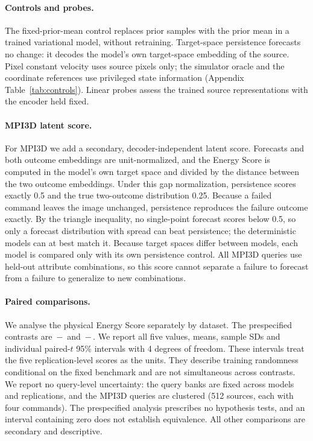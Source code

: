 \paragraph{Controls and probes.} The fixed-prior-mean control replaces prior samples with the prior mean in a trained variational model, without retraining. Target-space persistence forecasts no change: it decodes the model's own target-space embedding of the source. Pixel constant velocity uses source pixels only; the simulator oracle and the coordinate references use privileged state information (Appendix Table~\ref{tab:controls}). Linear probes assess the trained source representations with the encoder held fixed.

\paragraph{MPI3D latent score.} For MPI3D we add a secondary, decoder-independent latent score. Forecasts and both outcome embeddings are unit-normalized, and the Energy Score is computed in the model's own target space and divided by the distance between the two outcome embeddings. Under this gap normalization, persistence scores exactly 0.5 and the true two-outcome distribution 0.25. Because a failed command leaves the image unchanged, persistence reproduces the failure outcome exactly. By the triangle inequality, no single-point forecast scores below 0.5, so only a forecast distribution with spread can beat persistence; the deterministic models can at best match it. Because target spaces differ between models, each model is compared only with its own persistence control. All MPI3D queries use held-out attribute combinations, so this score cannot separate a failure to forecast from a failure to generalize to new combinations.

\paragraph{Paired comparisons.} We analyse the physical Energy Score separately by dataset. The prespecified contrasts are \shvar{}\,$-$\,\shdet{} and \shvar{}\,$-$\,\emavar{}. We report all five values, means, sample SDs and individual paired-$t$ 95\% intervals with 4 degrees of freedom. These intervals treat the five replication-level scores as the units. They describe training randomness conditional on the fixed benchmark and are not simultaneous across contrasts. We report no query-level uncertainty: the query banks are fixed across models and replications, and the MPI3D queries are clustered (512 sources, each with four commands). The prespecified analysis prescribes no hypothesis tests, and an interval containing zero does not establish equivalence. All other comparisons are secondary and descriptive.
